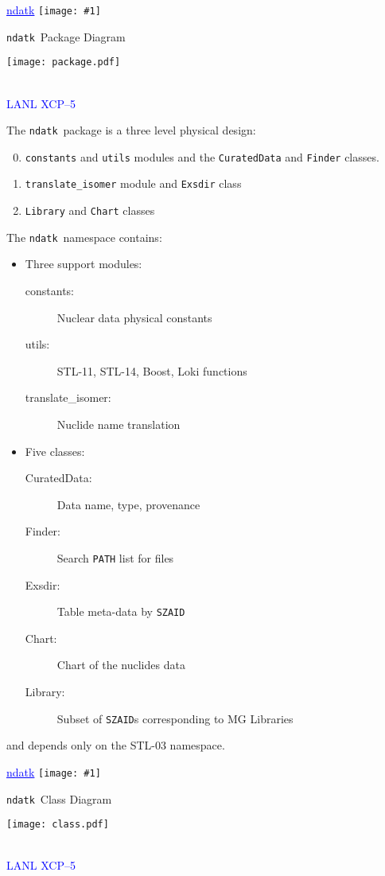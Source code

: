 \documentclass[clock]{slides}
\newenvironment{xslide}[1][logo.jpg]{\begin{slide} \tiny
\textcolor{blue}{\underline{ndatk}} \hfill
\texttt{[image: \#1]}
\normalsize}{\vfill\tiny
\textcolor{blue}{\hrulefill \\LANL XCP--5}
\end{slide}}
\newcommand{\ndatk}{\texttt{ndatk}}
\newcommand{\zaid}{\texttt{SZAID}}
\begin{document}
\begin{xslide}
\begin{center}\Large
\ndatk\ Package Diagram
\end{center}
\begin{center}
\texttt{[image: package.pdf]}
\end{center}
\end{xslide}

\begin{note}\small
The \ndatk\ package is a three level physical design:
\begin{enumerate}
\setcounter{enumi}{-1}
\item \texttt{constants} and \texttt{utils} modules and the
  \texttt{CuratedData} and \texttt{Finder} classes.
\item \texttt{translate\_isomer} module and \texttt{Exsdir} class
\item \texttt{Library} and \texttt{Chart} classes
\end{enumerate}

The \ndatk\ namespace contains: 
\begin{itemize}
\item Three support modules:
\begin{description}
\item[constants: ] Nuclear data physical constants
\item[utils: ] STL-11, STL-14, Boost, Loki functions
\item[translate\_isomer: ] Nuclide name translation
\end{description}
\item Five classes:
\begin{description}
\item[CuratedData: ] Data name, type, provenance
\item[Finder: ] Search \texttt{PATH} list for files
\item[Exsdir: ] Table meta-data by \zaid
\item[Chart: ] Chart of the nuclides data
\item[Library: ] Subset of \zaid s corresponding to MG Libraries
\end{description}
\end{itemize} 
and depends only on the STL-03 namespace.
\end{note}

\begin{xslide}
\begin{center}\Large
\ndatk\ Class Diagram
\end{center}
\begin{center}
\texttt{[image: class.pdf]}
\end{center}
\end{xslide}
\end{document}
